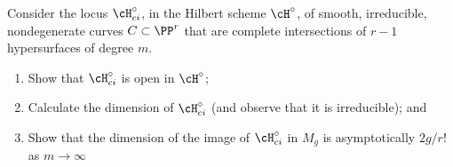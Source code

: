 \begin{exercise}\label{balanced CI in higher codim}
Consider the locus $\cH^\circ_{ci}$, in the Hilbert scheme $\cH^\circ$, of smooth, irreducible, nondegenerate curves $C \subset \PP^r$ that are complete intersections of $r-1$ hypersurfaces of degree $m$. 
\begin{enumerate}
\item Show that $\cH^\circ_{ci}$ is open in $\cH^\circ$;
\item Calculate the dimension of $\cH^\circ_{ci}$ (and observe that it is irreducible); and
\item Show that the dimension of the image of $\cH^\circ_{ci}$ in $M_g$ is asymptotically $2g/r!$ as $m \to \infty$
\end{enumerate}
\end{exercise}


